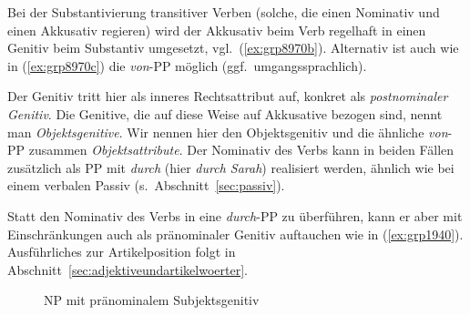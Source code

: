 
Bei der Substantivierung transitiver Verben (solche, die einen Nominativ und einen Akkusativ regieren) wird der Akkusativ beim Verb regelhaft in einen Genitiv beim Substantiv umgesetzt, vgl.\ (\ref{ex:grp8970b}).
Alternativ ist auch wie in (\ref{ex:grp8970c}) die \textit{von}-PP möglich (ggf.\ umgangssprachlich).

\begin{exe}
  \ex\label{ex:grp8970}
  \begin{xlist}
  \end{xlist}
\end{exe}

Der Genitiv tritt hier als inneres Rechtsattribut auf, konkret als \textit{postnominaler Genitiv}.
Die Genitive, die auf diese Weise auf Akkusative bezogen sind, nennt man \textit{Objektsgenitive}.
Wir nennen hier den Objektsgenitiv und die ähnliche \textit{von}-PP zusammen \textit{Objektsattribute}.
Der Nominativ des Verbs kann in beiden Fällen zusätzlich als PP mit \textit{durch} (hier \textit{durch Sarah}) realisiert werden, ähnlich wie bei einem verbalen Passiv (s.\ Abschnitt~\ref{sec:passiv}).


Statt den Nominativ des Verbs in eine \textit{durch}-PP zu überführen, kann er aber mit Einschränkungen auch als pränominaler Genitiv auftauchen wie in (\ref{ex:grp1940}).
Ausführliches zur Artikelposition folgt in Abschnitt~\ref{sec:adjektiveundartikelwoerter}.

\begin{exe}
  \ex\label{ex:grp1940}
  \begin{xlist}
  \end{xlist}
\end{exe}

\begin{figure}[!htbp]
  \centering
  \caption{NP mit pränominalem Subjektsgenitiv}
  \label{fig:grp1940b}
\end{figure}

